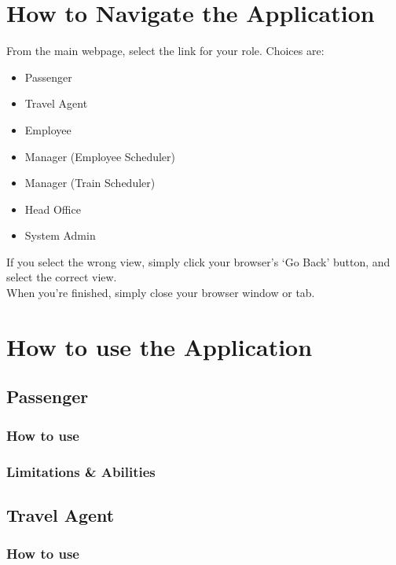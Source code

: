 \section{How to Navigate the Application}
From the main webpage, select the link for your role. Choices are: 
\begin{itemize}
\item Passenger
\item Travel Agent
\item Employee
\item Manager (Employee Scheduler)
\item Manager (Train Scheduler)
\item Head Office
\item System Admin
\end{itemize}

If you select the wrong view, simply click your browser's `Go Back' button, and select the correct view. \\

When you're finished, simply close your browser window or tab.


\section{How to use the Application}

\subsection{Passenger}
\subsubsection{How to use}

\subsubsection{Limitations \& Abilities}



\subsection{Travel Agent}
\subsubsection{How to use}

